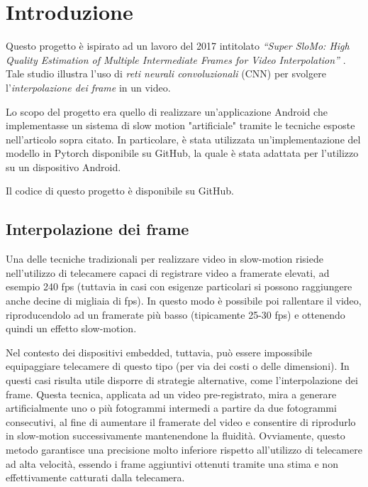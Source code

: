 \chapter*{Introduzione}

Questo progetto è ispirato ad un lavoro del 2017 intitolato 
\textit{``Super SloMo: High Quality Estimation of Multiple Intermediate Frames for Video Interpolation''} \cite{paper_superslomo}.
Tale studio illustra l'uso di \textit{reti neurali convoluzionali} (CNN) per svolgere l'\textit{interpolazione dei frame} 
in un video.

Lo scopo del progetto era quello di realizzare un'applicazione Android che implementasse un sistema di slow motion 
"artificiale" tramite le tecniche esposte nell'articolo sopra citato. In particolare, è stata utilizzata 
un'implementazione del modello in Pytorch disponibile su GitHub\cite{git_superslowmo}, la quale è stata adattata per l'utilizzo su un 
dispositivo Android.

Il codice di questo progetto è disponibile su GitHub\cite{git_progetto}.

\section*{Interpolazione dei frame}

Una delle tecniche tradizionali per realizzare video in slow-motion risiede nell'utilizzo di telecamere capaci di 
registrare video a framerate elevati, ad esempio 240 fps (tuttavia in casi con esigenze particolari si possono 
raggiungere anche decine di migliaia di fps). In questo modo è possibile poi rallentare il video, riproducendolo ad 
un framerate più basso (tipicamente 25-30 fps) e ottenendo quindi un effetto slow-motion.

Nel contesto dei dispositivi embedded, tuttavia, può essere impossibile equipaggiare telecamere di questo tipo (per via
dei costi o delle dimensioni). In questi casi risulta utile disporre di strategie alternative, come l'interpolazione dei 
frame. Questa tecnica, applicata ad un video pre-registrato, mira a generare artificialmente uno o più fotogrammi intermedi 
a partire da due fotogrammi consecutivi, al fine di aumentare il framerate del video e consentire di riprodurlo in slow-motion
successivamente mantenendone la fluidità. Ovviamente, questo metodo garantisce una precisione molto inferiore rispetto
all'utilizzo di telecamere ad alta velocità, essendo i frame aggiuntivi ottenuti tramite una stima e non effettivamente
catturati dalla telecamera.

